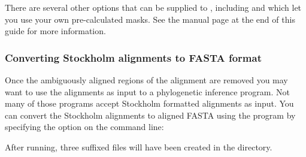 There are several other options that can be supplied to
, including  and  which let you 
use your own pre-calculated masks. See the 
manual page at the end of this guide for more information. 

\subsubsection{Converting Stockholm alignments to FASTA format}
Once the ambiguously aligned regions of the alignment are removed you may
want to use the alignments as input to a phylogenetic inference
program. Not many of those programs accept Stockholm formatted
alignments as input. You can convert the Stockholm alignments to aligned FASTA
using the  program by specifying the 
option on the command line:


After running, three  suffixed files will have been created
in the  directory.




